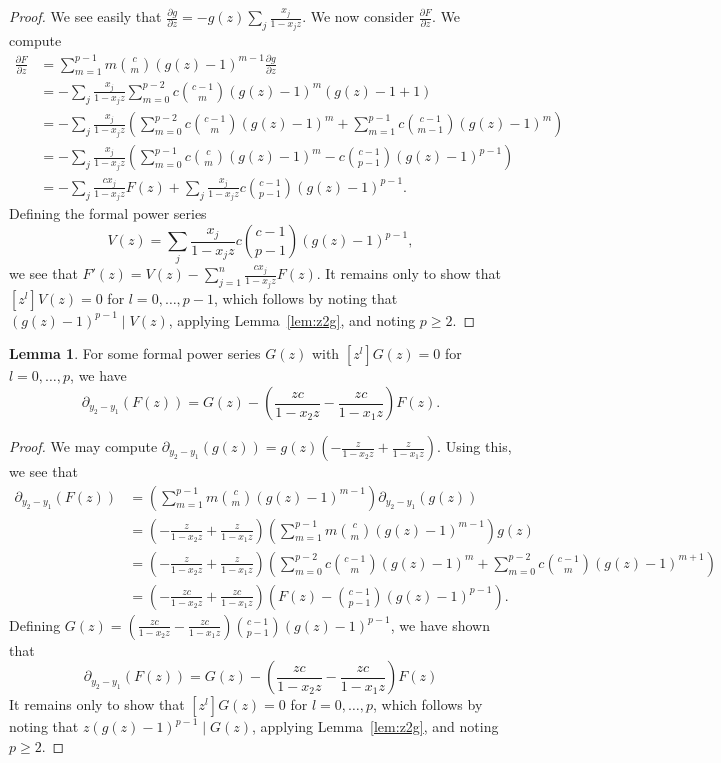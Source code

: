 \documentclass{amsart}
\numberwithin{equation}{section}
\theoremstyle{definition}
\newtheorem{lemma}[theorem]{Lemma}
\begin{document}
\begin{proof}
We see easily that $\frac{\partial g}{\partial z} = -g(z) \sum_j \frac{x_j}{1-x_jz}$. We now consider $\frac{\partial F}{\partial z}$. We compute
\begin{align*}
\frac{\partial F}{\partial z}
&=\sum_{m=1}^{p-1}m\binom{c}{m}(g(z)-1)^{m-1}\frac{\partial g}{\partial z}\\
&=-\sum_j \frac{x_j}{1-x_jz}\sum_{m=0}^{p-2}c\binom{c-1}{m}(g(z)-1)^{m}(g(z)-1+1)\\
&=-\sum_j \frac{x_j}{1-x_jz}\left(\sum_{m=0}^{p-2}c\binom{c-1}{m}(g(z)-1)^{m}+\sum_{m=1}^{p-1}c\binom{c-1}{m-1}(g(z)-1)^{m}\right)\\
&=-\sum_j \frac{x_j}{1-x_jz}\left(\sum_{m=0}^{p-1}c\binom{c}{m}(g(z)-1)^{m}-c\binom{c-1}{p-1}(g(z)-1)^{p-1}\right)\\
&=-\sum_j \frac{cx_j}{1-x_jz}F(z)+\sum_j \frac{x_j}{1-x_jz}c\binom{c-1}{p-1}(g(z)-1)^{p-1}.
\end{align*}
Defining the formal power series
\[
V(z)=\sum_j \frac{x_j}{1-x_jz}c\binom{c-1}{p-1}(g(z)-1)^{p-1},
\]
we see that $F'(z) = V(z) - \sum_{j=1}^{n} \frac{cx_j}{1-x_jz} F(z)$. It remains only to show that $[z^l]V(z)=0$ for $l=0,\dots,p-1$, which follows by noting that $(g(z)-1)^{p-1} \mid V(z)$, applying Lemma~\ref{lem:z2g}, and noting $p \ge 2$.
\end{proof}

\begin{lemma}\label{lem:dFdxi} 
For some formal power series $G(z)$ with $[z^l]G(z)=0$ for $l=0,\dots,p$, we have
\[
\partial_{y_2-y_1}(F(z))= G(z) - \left(\frac{zc}{1-x_2z}-\frac{zc}{1-x_1z}\right)F(z).
\]
\end{lemma}
\begin{proof}
We may compute $\partial_{y_2-y_1}(g(z))=g(z)\left(-\frac{z}{1-x_2z}+\frac{z}{1-x_1z}\right)$. Using this, we see that
\begin{align*}
\partial_{y_2-y_1}(F(z))&=\left(\sum_{m=1}^{p-1}m\binom{c}{m}(g(z)-1)^{m-1}\right)\partial_{y_2-y_1}(g(z))\\
&=\left(-\frac{z}{1-x_2z}+\frac{z}{1-x_1z}\right)\left(\sum_{m=1}^{p-1}m\binom{c}{m}(g(z)-1)^{m-1}\right)g(z)\\
&=\left(-\frac{z}{1-x_2z}+\frac{z}{1-x_1z}\right)\left(\sum_{m=0}^{p-2}c\binom{c-1}{m}(g(z)-1)^{m}+\sum_{m=0}^{p-2}c\binom{c-1}{m}(g(z)-1)^{m+1}\right)\\
&=\left(-\frac{zc}{1-x_2z}+\frac{zc}{1-x_1z}\right)\left(F(z)-\binom{c-1}{p-1}(g(z)-1)^{p-1}\right).
\end{align*}
Defining $G(z)=\left(\frac{zc}{1-x_2z}- \frac{zc}{1-x_1z}\right)\binom{c-1}{p-1}(g(z)-1)^{p-1}$, we have shown that
\[
\partial_{y_2-y_1}(F(z))= G(z) - \left(\frac{zc}{1-x_2z}-\frac{zc}{1-x_1z}\right)F(z)
\]
It remains only to show that $[z^l]G(z)=0$ for $l=0,\dots,p$, which follows by noting that $z(g(z)-1)^{p-1} \mid G(z)$, applying Lemma~\ref{lem:z2g}, and noting $p \geq 2$.
\end{proof}
\end{document}

